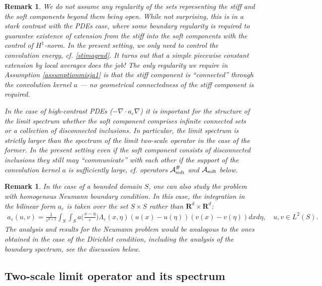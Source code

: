 \documentclass[11pt]{article}
\newcommand\e {\varepsilon}
\newcommand\soft{{\rm soft}}
\newcommand{\R}{\mathbf{R}}
\newcommand\A{\mathcal A}
\newcounter{bei}
\newtheorem{remark}[theorem]{Remark}
\theoremstyle{remark}
\begin{document}
\begin{remark}
	We do not assume any regularity of the sets representing the stiff and the soft components beyond them being open. While not surprising, this is in a stark contrast with the PDEs case, where some boundary regularity is required to guarantee existence of extension from the stiff into the soft components with the control of $H^1$-norm. In the present setting, we only need to control the convolution energy, cf. \eqref{stimagrad}. It turns out that a simple piecewise constant extension by local averages does the job! The only regularity we require in Assumption \ref{assumptionmisja1} is that the stiff component is ``connected'' through the convolution kernel $a$ --- no geometrical connectedness of the stiff component is required.
	
	In the case of high-contrast PDEs ($-\nabla\cdot a_\e \nabla$) it is important for the structure of the limit spectrum whether the soft component comprises infinite connected sets or a collection of disconnected inclusions. In particular, the limit spectrum is strictly larger than the spectrum of the limit two-scale operator in the case of the former. In the present setting even if the soft component consists of disconnected inclusions they still may ``communicate'' with each other if the support of the convolution kernel $a$ is sufficiently large, cf. operators $\A_\soft^\#$ and $\A_\soft$ below.
\end{remark}

\begin{remark}
	In the case of a bounded domain $S$, one can  also study  the  problem with homogenous Neumann boundary condition. In this case, the integration in the bilinear form $a_\e$  is taken over the set $S \times S$ rather than $\R^d \times \R^d$:
	\begin{eqnarray*}
		a_\e  (u,v) = \frac{1}{\e^{d+2}} \int_{S}\int_{S} a \Big(\frac{x-\eta }\e \Big) \Lambda_\e  (x,\eta ) (u(x)-u(\eta ))(v(x)-v(\eta ))dx d\eta, \quad u,v \in L^2(S).
	\end{eqnarray*}
	The analysis and results for the Neumann problem would be analogous to  the ones obtained in the case of the  Dirichlet condition, including the analysis of the boundary spectrum, see the discussion below.
\end{remark}

\subsection{Two-scale limit operator and its spectrum}\label{s2.1}
\end{document}
